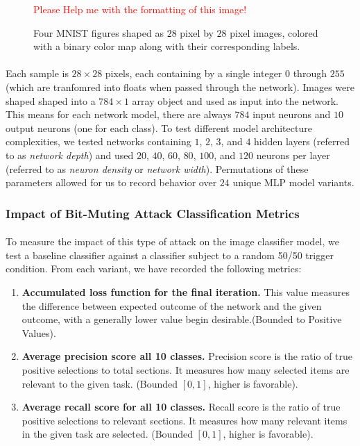 \documentclass[12pt,letterpaper]{article}
\begin{document}
\begin{figure}[h]
	\label{MNIST}
	\centering
	\textcolor{red}{Please Help me with the formatting of this image!}
	\caption{Four MNIST figures shaped as $28$ pixel by $28$ pixel images, colored with a binary color map along with their corresponding labels.}
\end{figure}

\paragraph*{}Each sample is $28 \times 28$ pixels, each containing by a single integer $0$ through $255$ (which are tranfomred into floats when passed through the network). Images were shaped shaped into a $784 \times 1$ array object and used as input into the network. This means for each network model, there are always $784$ input neurons and $10$ output neurons (one for each class). To test different model architecture complexities, we tested networks containing $1$, $2$, $3$, and $4$ hidden layers (referred to as \textit{network depth}) and used $20$, $40$, $60$, $80$, $100$, and $120$ neurons per layer (referred to as \textit{neuron density} or \textit{network width}). Permutations of these parameters allowed for us to record behavior over $24$ unique MLP model variants.

\subsubsection{Impact of Bit-Muting Attack Classification Metrics}

\paragraph*{}To measure the impact of this type of attack on the image classifier model, we test a baseline classifier against a classifier subject to a random 50/50 trigger condition. From each variant, we have recorded the following metrics:

\begin{enumerate}
\item \textbf{Accumulated loss function for the final iteration.} This value measures the difference between expected outcome of the network and the given outcome, with a generally lower value begin desirable.(Bounded to Positive Values). 
\item \textbf{Average precision score all 10 classes.} Precision score is the ratio of true positive selections to total sections. It measures how many selected items are relevant to the given task. (Bounded $[0,1]$, higher is favorable).
\item \textbf{Average recall score for all 10 classes.} Recall score is the ratio of true positive selections to relevant sections. It measures how many relevant items in the given task are selected. (Bounded $[0,1]$, higher is favorable).
\end{enumerate} 
\end{document}
